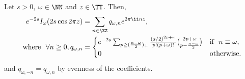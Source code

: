 \documentclass{article}
\begin{document}
\begin{lemma}\label{lem:fourier-bessel-cos}
  Let $s > 0$, $\omega \in \NN$ and $z \in \TT$. Then,
  \begin{equation}\label{eq:lem-fourier-bessel-cos-result}
    \begin{aligned}
      e^{-2s} I_{\omega}(2s \cos 2\pi z)              & = \sum_{n \in \ZZ} q_{\omega, n} e^{2\pi \ii n z}, \\
      \text{where} ~~ \forall n \geq 0, q_{\omega, n} & = \begin{cases}
        e^{-2s} \sum_{p \geq (\frac{n - \omega}{2})_+} \frac{(s/2)^{2p + \omega}}{p! (p + \omega)!} \binom{2p + \omega}{p - \frac{n - \omega}{2}} & \text{if} ~~ n \equiv \omega, \\
        0                                                                                                                                         & \text{otherwise.}
      \end{cases}
    \end{aligned}
  \end{equation}
  and $q_{\omega, -n} = q_{\omega, n}$ by evenness of the coefficients.
\end{lemma}
\end{document}
